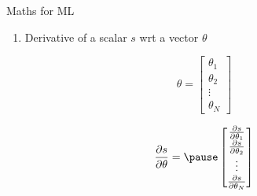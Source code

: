 \documentclass{beamer}
\newcounter{saveenumi}
\newcommand{\seti}{\setcounter{saveenumi}{\value{enumi}}}
\newcommand{\conti}{\setcounter{enumi}{\value{saveenumi}}}
\begin{document}
\begin{frame}{Maths for ML}

\begin{enumerate}
	\conti
	\item Derivative of a scalar $s$ wrt a vector $\theta$
	\seti
\end{enumerate}
 
    $$
        \theta = \begin{bmatrix}
  \theta_{1}\\
  \theta_{2}\\
  \vdots\\
  \theta_{N}
    \end{bmatrix}   
  $$
  


   
 
  $$
        \frac{\partial s}{\partial \theta} =\pause  \begin{bmatrix}
  \frac{\partial s}{\partial \theta_{1}}\\
  \frac{\partial s}{\partial \theta_{2}}\\
    \vdots\\
  \frac{\partial s}{\partial \theta_{N}}\\
    \end{bmatrix}
 $$
      
   
    

\end{frame}
\end{document}
